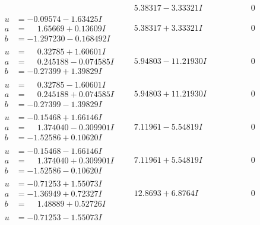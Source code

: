 \documentclass[1p]{elsarticle_modified}
\theoremstyle{definition}
\begin{document}
$$\begin{array}{c|c|c}
 & \phantom{-}5.38317 - 3.33321 I & \phantom{-0.000000 } 0 \\ \hline\begin{aligned}
u &= -0.09574 - 1.63425 I \\
a &= \phantom{-}1.65669 + 0.13609 I \\
b &= -1.297230 - 0.168492 I\end{aligned}
 & \phantom{-}5.38317 + 3.33321 I & \phantom{-0.000000 } 0 \\ \hline\begin{aligned}
u &= \phantom{-}0.32785 + 1.60601 I \\
a &= \phantom{-}0.245188 - 0.074585 I \\
b &= -0.27399 + 1.39829 I\end{aligned}
 & \phantom{-}5.94803 - 11.21930 I & \phantom{-0.000000 } 0 \\ \hline\begin{aligned}
u &= \phantom{-}0.32785 - 1.60601 I \\
a &= \phantom{-}0.245188 + 0.074585 I \\
b &= -0.27399 - 1.39829 I\end{aligned}
 & \phantom{-}5.94803 + 11.21930 I & \phantom{-0.000000 } 0 \\ \hline\begin{aligned}
u &= -0.15468 + 1.66146 I \\
a &= \phantom{-}1.374040 - 0.309901 I \\
b &= -1.52586 + 0.10620 I\end{aligned}
 & \phantom{-}7.11961 - 5.54819 I & \phantom{-0.000000 } 0 \\ \hline\begin{aligned}
u &= -0.15468 - 1.66146 I \\
a &= \phantom{-}1.374040 + 0.309901 I \\
b &= -1.52586 - 0.10620 I\end{aligned}
 & \phantom{-}7.11961 + 5.54819 I & \phantom{-0.000000 } 0 \\ \hline\begin{aligned}
u &= -0.71253 + 1.55073 I \\
a &= -1.36949 + 0.72327 I \\
b &= \phantom{-}1.48889 + 0.52726 I\end{aligned}
 & \phantom{-}12.8693 + 6.8764 I & \phantom{-0.000000 } 0 \\ \hline\begin{aligned}
u &= -0.71253 - 1.55073 I \\

\end{aligned}
\end{array}$$
\end{document}
